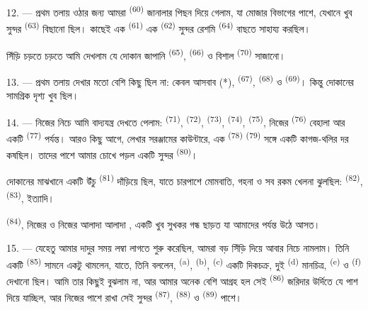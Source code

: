 12. --- প্রথম তলায় ওঠার জন্য আমরা  \textsuperscript{(60)}
জানালার পিছন দিয়ে গেলাম, যা মোজার বিভাগের পাশে, যেখানে খুব সুন্দর
 \textsuperscript{(63)} বিছানো ছিল। কাছেই এক  \textsuperscript{(61)} এক  \textsuperscript{(62)}
সুন্দর রেশমি  \textsuperscript{(64)} বাছতে সাহায্য করছিল।

সিঁড়ি চড়তে চড়তে আমি দেখলাম যে দোকান জাপানি 
\textsuperscript{(65)},  \textsuperscript{(66)} ও বিশাল
 \textsuperscript{(70)} সাজানো।

13. --- প্রথম তলায় দেখার মতো বেশি কিছু ছিল না: কেবল আসবাব (*),
 \textsuperscript{(67)}, 
\textsuperscript{(68)} ও  \textsuperscript{(69)}। কিন্তু দোকানের
সামগ্রিক দৃশ্য খুব  ছিল।

14. --- নিজের নিচে আমি বাদ্যযন্ত্র দেখতে পেলাম: 
\textsuperscript{(71)},  \textsuperscript{(72)},
 \textsuperscript{(73)}, 
\textsuperscript{(74)},  \textsuperscript{(75)}, নিজের
 \textsuperscript{(76)} বেহালা আর একটি 
\textsuperscript{(77)} পর্যন্ত। আরও কিছু আগে, লেখার সরঞ্জামের কাউন্টারে, এক
 \textsuperscript{(78)} 
\textsuperscript{(79)} সঙ্গে একটি কাগজ-থলির দর কষছিল। তাদের পাশে আমার চোখে পড়ল
একটি সুন্দর  \textsuperscript{(80)}।

দোকানের মাঝখানে একটি উঁচু  \textsuperscript{(81)}
দাঁড়িয়ে ছিল, যাতে চারপাশে মোমবাতি, গহনা ও সব রকম খেলনা ঝুলছিল:
 \textsuperscript{(82)}, 
\textsuperscript{(83)}, ইত্যাদি।

 \textsuperscript{(84)}, নিজের  ও নিজের
আলাদা আলাদা , একটি খুব সুখকর গন্ধ ছাড়ত যা আমাদের পর্যন্ত উঠে
আসত।

\VUsaut{3.4mm}
\VUsaut{2.8mm}

15. --- যেহেতু আমার দাদুর সময় লম্বা লাগতে শুরু করেছিল, আমরা বড় সিঁড়ি দিয়ে
আবার নিচে নামলাম। তিনি একটি  \textsuperscript{(85)}
সামনে একটু থামলেন, যাতে, তিনি বললেন,  \textsuperscript{(a)},
 \textsuperscript{(b)}, 
\textsuperscript{(c)}  একটি দিকচক্র,
দুই  \textsuperscript{(d)} মানচিত্র, 
\textsuperscript{(e)} ও  \textsuperscript{(f)} দেখানো ছিল। আমি তার
কিছুই বুঝলাম না, আর আমার অনেক বেশি আগ্রহ হল সেই 
\textsuperscript{(86)} জরিদার উর্দিতে যে পাশ দিয়ে যাচ্ছিল, আর নিজের পাশে রাখা
সেই সুন্দর  \textsuperscript{(87)}, 
\textsuperscript{(88)} ও  \textsuperscript{(89)} পাশে।

